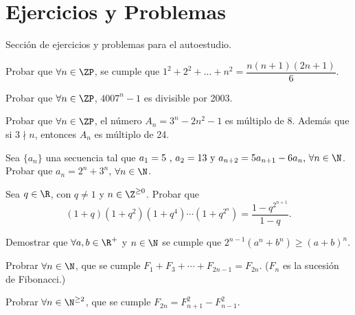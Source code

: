 \section{Ejercicios y Problemas}
{
    Sección de ejercicios y problemas para el autoestudio.

    \begin{section-problem}
        Probar que $\forall n \in \ZP$, se cumple que $1^2 + 2^2 + \dots + n^2 = \dfrac{n(n+1)(2n+1)}{6}$.
    \end{section-problem}

    \begin{section-problem}
        Probar que $\forall n\in \ZP$, $4007^n - 1$ es divisible por 2003.
    \end{section-problem}

    \begin{section-problem}
        Probar que $\forall n \in \ZP$, el número $A_n = 3^n - 2n^2 - 1$ es múltiplo de $8$.
        Además que si $3\nmid n$, entonces $A_n$ es múltiplo de 24.
    \end{section-problem}

    \begin{section-problem}
        Sea $\{a_n\}$ una secuencia tal que $a_1 = 5 \mbox{ , } a_2 = 13 \mbox{ y } a_{n+2}=5a_{n+1}-6a_n \mbox{, } \forall n \in \N$.
        Probar que $a_n = 2^n+3^n$, $\forall n \in \N$.
    \end{section-problem}

    \begin{section-problem}
        Sea $q \in \R$, con $q \neq 1$ y $n \in \Z^{\geq 0}$.
        Probar que
        \[(1 + q)(1 + q^2)(1 + q^4)\cdots(1 + q^{2^n}) = \frac{1 - q^{2^{n + 1}} }{1 - q}.\]
    \end{section-problem}

    \begin{section-problem}
        Demostrar que $\forall a, b\in \R^+$ y $n \in \N$ se cumple que $2^{n - 1}(a^n + b^n) \geq (a + b)^n.$
    \end{section-problem}

    \begin{section-problem}
        Probrar $\forall n \in \N$, que se cumple $F_1 + F_3 + \cdots + F_{2n - 1} = F_{2n}.$ ($F_n$ es la sucesión de Fibonacci.)
    \end{section-problem}

    \begin{section-problem}
        Probrar $\forall n \in \N^{\geq 2}$, que se cumple $F_{2n} = F_{n + 1}^2 - F_{n - 1}^2.$
    \end{section-problem}
}